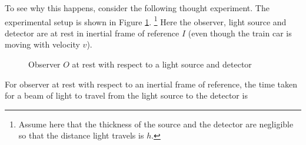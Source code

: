\documentclass{article}
\theoremstyle{definition}
\begin{document}
\bigskip
\noindent
To see why this happens, consider the following thought experiment. The 
experimental setup is shown in Figure \ref{figure:observer_at_rest}. 
\footnote{Assume here that the thickness of the source and the
detector are negligible so that the distance light travels is
$h$.} Here the observer, light source and detector are at rest in
inertial frame of reference $I$ (even though the train car is
moving with velocity $v$).


\begin{figure}[H]
  \centering
    \resizebox{0.65 \textwidth}{!} {                                    %
   }
 \caption{Observer $O$ at rest with respect to a light source and detector}
 \label{figure:observer_at_rest}
\end{figure}

\bigskip
\noindent
For observer at rest with respect to an inertial frame of
reference, the time taken for a beam of light to travel from the
light source to the detector is
\end{document}
